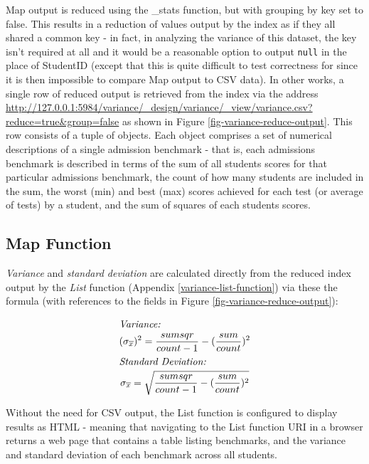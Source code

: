 Map output is reduced using the \_stats function, but with grouping by key set to false. This results in a reduction of values output by the index as if they all shared a common key - in fact, in analyzing the variance of this dataset, the key isn't required at all and it would be a reasonable option to output \texttt{null} in the place of StudentID (except that this is quite difficult to test correctness for since it is then impossible to compare Map output to CSV data). In other works, a single row of reduced output is retrieved from the index via the address \url{http://127.0.0.1:5984/variance/_design/variance/_view/variance.csv?reduce=true&group=false} as shown in Figure \ref{fig-variance-reduce-output}. This row consists of a tuple of objects. Each object comprises a set of numerical descriptions of a single admission benchmark - that is, each admissions benchmark is described in terms of the sum of all students scores for that particular admissions benchmark, the count of how many students are included in the sum, the worst (min) and best (max) scores achieved for each test (or average of tests) by a student, and the sum of squares of each students scores.



\subsection{Map Function}
\textit{Variance} and \textit{standard deviation} are calculated directly from the reduced index output by the \textit{List} function (Appendix \ref{variance-list-function}) via these the formula (with references to the fields in Figure \ref{fig-variance-reduce-output}):

\begin{spreadlines}{15pt}
    \begin{gather*}
        \intertext{\textit{Variance:}}
        (\sigma_{\overline{x}})^{2} = \frac{sumsqr}{count-1} - (\frac{sum}{count})^{2}\\
        \intertext{\textit{Standard Deviation:}}
        \sigma_{\overline{x}} = \sqrt{\frac{sumsqr}{count-1} - (\frac{sum}{count})^{2}}
    \end{gather*}
\end{spreadlines}

Without the need for CSV output, the List function is configured to display results as HTML - meaning that navigating to the List function URI in a browser returns a web page that contains a table listing benchmarks, and the variance and standard deviation of each benchmark across all students.